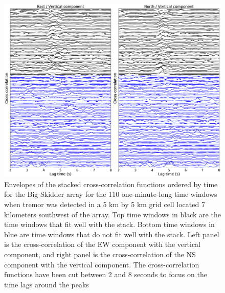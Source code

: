 \documentclass[draft]{agujournal2019}
\begin{document}
\begin{figure}
\noindent\includegraphics[width=\textwidth, trim={0cm 0cm 0cm 0cm},clip]{figures/BS_-05_-05_PWS_PWS_cluster_ccwin.eps}
\caption{Envelopes of the stacked cross-correlation functions ordered by time for the Big Skidder array for the 110 one-minute-long time windows when tremor was detected in a 5 km by 5 km grid cell located 7 kilometers southwest of the array. Top time windows in black are the time windows that fit well with the stack. Bottom time windows in blue are time windows that do not fit well with the stack. Left panel is the cross-correlation of the EW component with the vertical component, and right panel is the cross-correlation of the NS component with the vertical component. The cross-correlation functions have been cut between 2 and 8 seconds to focus on the time lags around the peaks}
\label{pngfiguresample}
\end{figure}
\end{document}
